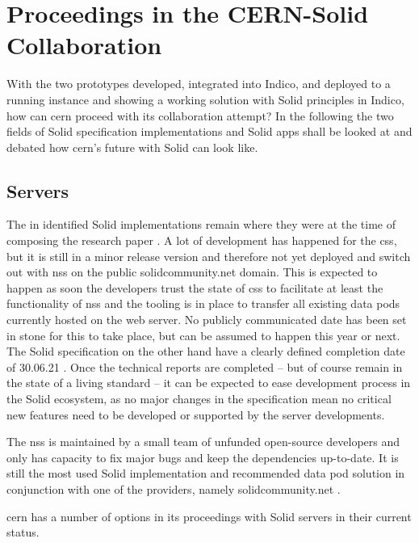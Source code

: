 \section{Proceedings in the CERN-Solid Collaboration}

With the two prototypes developed, integrated into Indico, and deployed to a running instance and showing a working solution with Solid principles in Indico, how can \gls{cern} proceed with its collaboration attempt? In the following the two fields of Solid specification implementations and Solid apps shall be looked at and debated how \gls{cern}'s future with Solid can look like.

\subsection{Servers}

The in \cite{cern-solid-investigation-spec} identified Solid implementations remain where they were at the time of composing the research paper \cite{cern-solid-investigation-spec}. A lot of development has happened for the \gls{css}, but it is still in a minor release version and therefore not yet deployed and switch out with \gls{nss} on the public solidcommunity.net domain. This is expected to happen as soon the developers trust the state of \gls{css} to facilitate at least the functionality of \gls{nss} and the tooling is in place to transfer all existing data pods currently hosted on the web server. No publicly communicated date has been set in stone for this to take place, but can be assumed to happen this year or next. The Solid specification on the other hand have a clearly defined completion date of 30.06.21 \cite{solid-tr}. Once the technical reports are completed -- but of course remain in the state of a living standard -- it can be expected to ease development process in the Solid ecosystem, as no major changes in the specification mean no critical new features need to be developed or supported by the server developments.

The \gls{nss} is maintained by a small team of unfunded open-source developers and only has capacity to fix major bugs and keep the dependencies up-to-date. It is still the most used Solid implementation and recommended data pod solution in conjunction with one of the providers, namely solidcommunity.net \cite{solid-community}.

\gls{cern} has a number of options in its proceedings with Solid servers in their current status.

